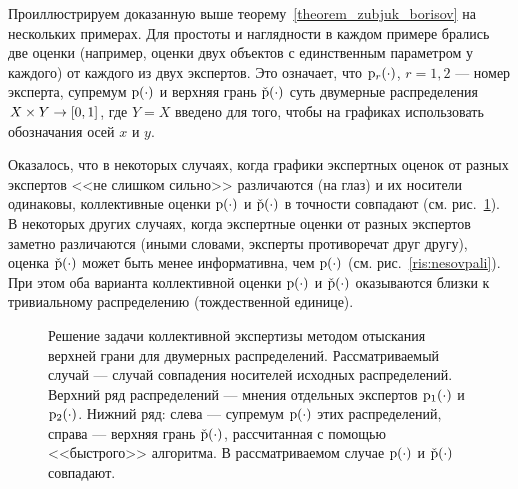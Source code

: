 Проиллюстрируем доказанную выше теорему~\ref{theorem_zubjuk_borisov} на нескольких примерах. Для простоты и наглядности в каждом примере брались две оценки (например, оценки двух объектов с единственным параметром у каждого) от каждого из двух экспертов. Это означает, что ${\mathrm{p}}_r(\cdot)$, $r = 1,2$ --- номер эксперта, супремум ${\mathrm{p}}(\cdot)$ и верхняя грань $\check{{\mathrm{p}}}(\cdot)$ суть двумерные  распределения $X \times Y \rightarrow [0,1]$, где $Y = X$ введено для того, чтобы на графиках использовать обозначания осей $x$ и $y$. 

Оказалось, что в некоторых случаях, когда графики экспертных оценок от разных экспертов <<не слишком сильно>> различаются (на глаз) и их носители одинаковы, коллективные оценки ${\mathrm{p}}(\cdot)$ и $\check{{\mathrm{p}}}(\cdot)$ в точности совпадают (см. рис.~\ref{ris:sovpali}). В некоторых других случаях, когда экспертные оценки от разных экспертов заметно различаются (иными словами, эксперты противоречат друг другу), оценка $\check{{\mathrm{p}}}(\cdot)$ может быть  менее информативна, чем ${\mathrm{p}}(\cdot)$ (см. рис.~\ref{ris:nesovpali}). При этом оба варианта коллективной оценки ${\mathrm{p}}(\cdot)$ и $\check{{\mathrm{p}}}(\cdot)$ оказываются близки к тривиальному распределению (тождественной единице).

\begin{figure}[h]
\caption{\small Решение задачи коллективной экспертизы методом отыскания верхней грани для двумерных распределений. Рассматриваемый случай --- случай совпадения носителей исходных распределений. Верхний ряд распределений --- мнения отдельных экспертов ${\mathrm{p}}_1(\cdot)$ и ${\mathrm{p}}_2(\cdot)$. Нижний ряд: слева --- супремум  ${\mathrm{p}}(\cdot)$ этих распределений, справа --- верхняя грань $\check{{\mathrm{p}}}(\cdot)$, рассчитанная с помощью <<быстрого>> алгоритма. В рассматриваемом случае ${\mathrm{p}}(\cdot)$ и $\check{{\mathrm{p}}}(\cdot)$ совпадают. }
\label{ris:sovpali}
\end{figure}

